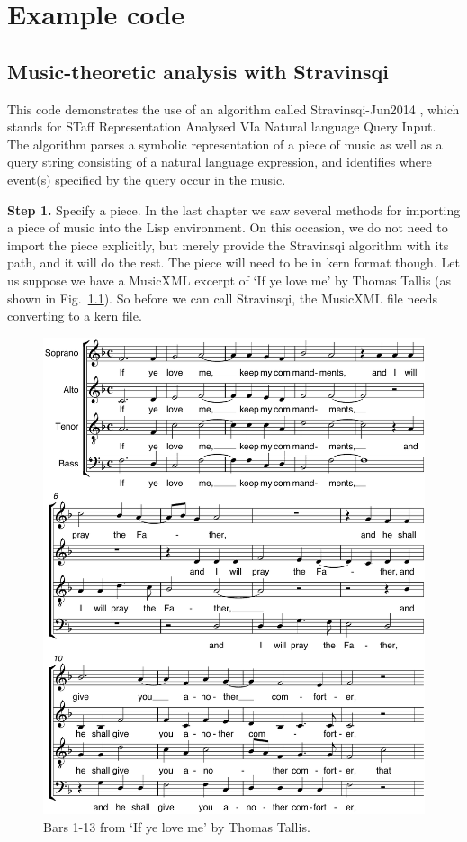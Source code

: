 \chapter{Example code}\label{chap:example-code}


\section[Music-theoretic analysis with Stravinsqi]{Music-theoretic analysis with Stravinsqi}\label{sec:stravinsqi}

This code demonstrates the use of an algorithm called
Stravinsqi-Jun2014 \citep{collins2014}, which stands
for STaff Representation Analysed VIa Natural language
Query Input. The algorithm parses a symbolic
representation of a piece of music as well as a query
string consisting of a natural language expression,
and identifies where event(s) specified by the query
occur in the music.

\textbf{Step 1.} Specify a piece. In the last
chapter we saw several methods for importing a piece
of music into the Lisp environment. On this occasion,
we do not need to import the piece explicitly, but
merely provide the Stravinsqi algorithm with its path,
and it will do the rest. The piece will need to be in
kern format though. Let us suppose we have a MusicXML
excerpt of `If ye love me' by Thomas Tallis (as shown
in Fig.~\ref{fig:tallis}). So before we can call
Stravinsqi, the MusicXML file needs converting to a
kern file.

\begin{figure}[htbp!]
\begin{center}
\includegraphics[width=0.8\columnwidth]{"Example code/figs/tallis-if-ye-love-me"}
\end{center}
\caption[Bars 1-13 from `If ye love me' by Thomas Tallis.]{Bars 1-13 from `If ye love me' by Thomas Tallis.}
\label{fig:tallis}
\end{figure}

